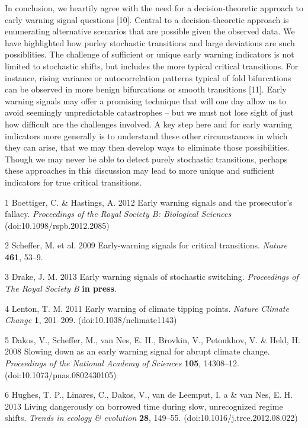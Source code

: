 \documentclass[review]{elsarticle} %
\begin{document}
In conclusion, we heartily agree with the need for a decision-theoretic
approach to early warning signal questions {[}10{]}. Central to a
decision-theoretic approach is enumerating alternative scenarios that
are possible given the observed data. We have highlighted how purley
stochastic transitions and large deviations are such possiblities. The
challenge of sufficient or unique early warning indicators is not
limited to stochastic shifts, but includes the more typical critical
transitions. For instance, rising variance or autocorrelation patterns
typical of fold bifurcations can be observed in more benign bifurcations
or smooth transitions {[}11{]}. Early warning signals may offer a
promising technique that will one day allow us to avoid seemingly
unpredictable catastrophes -- but we must not lose sight of just how
difficult are the challenges involved. A key step here and for early
warning indicators more generally is to understand these other
circumstances in which they can arise, that we may then develop ways to
eliminate those possibilities. Though we may never be able to detect
purely stochastic transitions, perhaps these approaches in this
discussion may lead to more unique and sufficient indicators for true
critical transitions.

1 Boettiger, C. \& Hastings, A. 2012 Early warning signals and the
prosecutor's fallacy. \emph{Proceedings of the Royal Society B:
Biological Sciences} (doi:10.1098/rspb.2012.2085)

2 Scheffer, M. et al. 2009 Early-warning signals for critical
transitions. \emph{Nature} \textbf{461}, 53--9.

3 Drake, J. M. 2013 Early warning signals of stochastic switching.
\emph{Proceedings of The Royal Society B} \textbf{in press}.

4 Lenton, T. M. 2011 Early warning of climate tipping points.
\emph{Nature Climate Change} \textbf{1}, 201--209.
(doi:10.1038/nclimate1143)

5 Dakos, V., Scheffer, M., van Nes, E. H., Brovkin, V., Petoukhov, V. \&
Held, H. 2008 Slowing down as an early warning signal for abrupt climate
change. \emph{Proceedings of the National Academy of Sciences}
\textbf{105}, 14308--12. (doi:10.1073/pnas.0802430105)

6 Hughes, T. P., Linares, C., Dakos, V., van de Leemput, I. a \& van
Nes, E. H. 2013 Living dangerously on borrowed time during slow,
unrecognized regime shifts. \emph{Trends in ecology \& evolution}
\textbf{28}, 149--55. (doi:10.1016/j.tree.2012.08.022)
\end{document}
